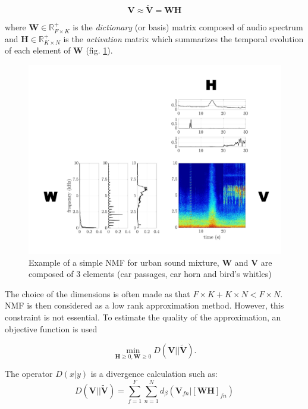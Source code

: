 \documentclass[twocolumn,a4paper,10pt]{article}
\begin{document}
\begin{equation}\label{eq:nmf}
\mathbf{V} \approx \mathbf{\tilde{V}} = \mathbf{WH}
\end{equation}

where $\mathbf{W} \in \mathbb{R}^+_{F \times K}$ is the \textit{dictionary} (or basis) matrix composed of audio spectrum and $\mathbf{H} \in \mathbb{R}^+_{K \times N}$ is the \textit{activation} matrix which summarizes the temporal evolution of each element of $\mathbf{W}$ (fig.  \ref{fig:example_NMF}).

\begin{figure}[t]
\centering
\includegraphics[width=0.9\linewidth]{../image/schema_introduction_nmf.pdf}
\caption{Example of a simple NMF  for urban sound mixture, $\mathbf{W}$ and $\mathbf{V}$ are composed of 3 elements (car passages, car horn and bird's whitles)}
\label{fig:example_NMF}
\end{figure}

The choice of the dimensions is often made as that $F\times K + K \times N < F \times N$. NMF is then considered as a low rank approximation method. However, this constraint is not essential. To estimate the quality of the approximation, an objective function is used

\begin{equation}\label{eq:min-D-WH}
\underset{\mathbf{H} \geq 0, \mathbf{W} \geq 0}{\min} D\left(\mathbf{V} \vert \vert \mathbf{\tilde{V}}\right).
\end{equation}

The operator $D(x\vert y)$ is a divergence calculation such as:
\begin{equation}
D\left(\textbf{V} \vert\vert \mathbf{\tilde{V}} \right) = \sum_{f = 1}^{F} \sum_{n = 1}^{N} d_{\beta}
\left(\textbf{V}_{fn} \vert \left[ \textbf{WH} \right]_{fn} \right)
\end{equation}
\end{document}
